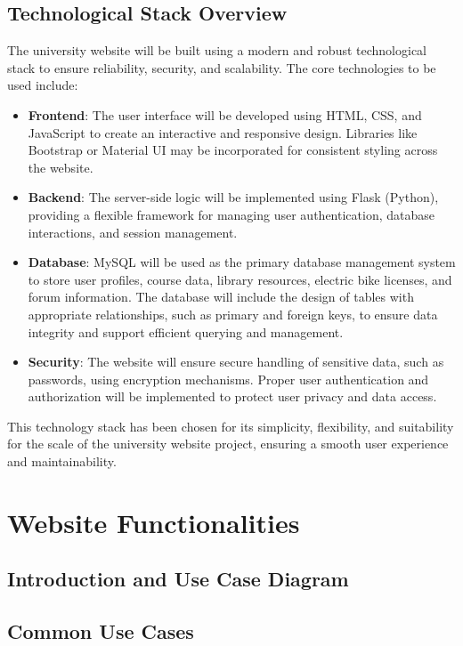 \documentclass[12pt]{article}
\begin{document}
\subsection{Technological Stack Overview}
The university website will be built using a modern and robust technological stack to ensure reliability, security, and scalability.
The core technologies to be used include:
\begin{itemize}
    \item \textbf{Frontend}: The user interface will be developed using HTML, CSS, and JavaScript to create an interactive and
     responsive design. Libraries like Bootstrap or Material UI may be incorporated for consistent styling across the website.
    \item \textbf{Backend}: The server-side logic will be implemented using Flask (Python), providing a flexible framework for
    managing user authentication, database interactions, and session management.
    \item \textbf{Database}: MySQL will be used as the primary database management system to store user profiles,
    course data, library resources, electric bike licenses, and forum information. The database will include the design of
    tables with appropriate relationships, such as primary and foreign keys, to ensure data integrity and support efficient
    querying and management.
    \item \textbf{Security}: The website will ensure secure handling of sensitive data, such as passwords, using encryption
    mechanisms. Proper user authentication and authorization will be implemented to protect user privacy and data access.
\end{itemize}
This technology stack has been chosen for its simplicity, flexibility, and suitability for the scale of the university website project,
ensuring a smooth user experience and maintainability.

\newpage
\section{Website Functionalities}
\subsection{Introduction and Use Case Diagram}
\subsection{Common Use Cases}
\end{document}
